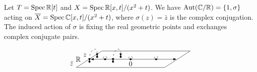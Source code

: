 \begin{example}
    Let $T = \operatorname{Spec} \mathbb{R}[t]$ and $X = \operatorname{Spec} \mathbb{R}[x, t]/(x^2 + t)$. We have $\operatorname{Aut}(\mathbb{C}/\mathbb{R}) = \{1, \sigma\}$ acting on $\overline{X} = \operatorname{Spec} \mathbb{C}[x, t]/(x^2 + t)$, where $\sigma(z) = \bar{z}$ is the complex conjugation. The induced action of $\sigma$ is fixing the real geometric points and exchanges complex conjugate pairs.
    \[
        \begin{tikzpicture}[>=Latex, scale=1]
        
            \def\A{0.23}
            \def\ang{-58}
        
            \coordinate (P1) at (-1.815,-0.59);
            \coordinate (P2) at ( 2.685,-0.59);
            \coordinate (P3) at ( 3.985, 0.25);
            \coordinate (P4) at (-0.515, 0.25);
        
            \draw (P1) -- (P2) -- (P3) -- (P4) -- cycle;
        
            \draw[<->] (-1.1,-0.17) -- (3.3,-0.17);
        
            \foreach \x in {-0.35,0.95,2.25} {
                \fill (\x,-0.17) circle (1.4pt);
                \draw[dashed] (\x,-0.1) circle (0.09);
            }
            
            \node[below] at (0.95,-0.17) {$0$};
            \node at (-1.38, 0.04) {$z$};
            \node at (-1.72,-0.17) {$\mathbb{R}$};
            \node at (-2.06,-0.38) {$\bar z$};
        
            \coordinate (C0) at (-0.95,-0.17);
            \begin{scope}[shift={(C0)},rotate=\ang]
                \coordinate (C0a) at (0,\A);
                \coordinate (C0b) at (0,-\A);
                \fill (C0a) circle (1.4pt);
                \fill (C0b) circle (1.4pt);
            \end{scope}
            \draw[dashed, <->]
                (C0a)
                .. controls ([yshift=0.60cm]C0a)
                            and ([yshift=0.60cm]C0b) ..
                (C0b);
        
            \coordinate (C1) at (0.25,-0.17);
            \begin{scope}[shift={(C1)},rotate=\ang]
                \coordinate (C1a) at (0,\A);
                \coordinate (C1b) at (0,-\A);
                \fill (C1a) circle (1.4pt);
                \fill (C1b) circle (1.4pt);
            \end{scope}
            \draw[dashed, <->]
                (C1a)
                .. controls ([yshift=0.60cm]C1a)
                            and ([yshift=0.60cm]C1b) ..
                (C1b);
        

\end{tikzpicture}\]
\end{example}
